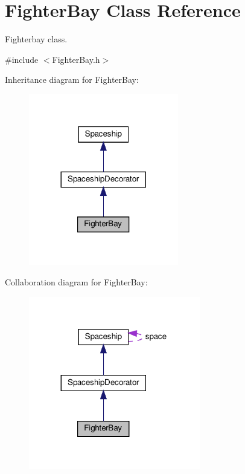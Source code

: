 \hypertarget{classFighterBay}{}\section{Fighter\+Bay Class Reference}
\label{classFighterBay}


Fighterbay class.  




{\ttfamily \#include $<$Fighter\+Bay.\+h$>$}



Inheritance diagram for Fighter\+Bay\+:\nopagebreak
\begin{figure}[H]
\begin{center}
\leavevmode
\includegraphics[width=185pt]{classFighterBay__inherit__graph}
\end{center}
\end{figure}


Collaboration diagram for Fighter\+Bay\+:\nopagebreak
\begin{figure}[H]
\begin{center}
\leavevmode
\includegraphics[width=212pt]{classFighterBay__coll__graph}
\end{center}
\end{figure}
